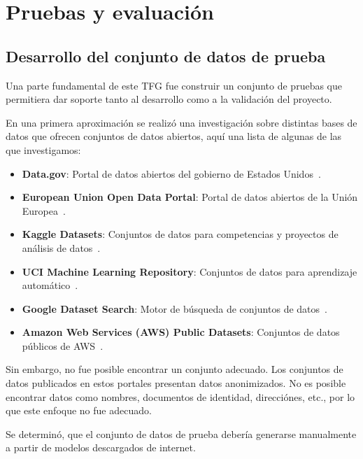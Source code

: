 \section{Pruebas y evaluación}\label{sec:pruebas_y_evaluacion}

\subsection*{Desarrollo del conjunto de datos de prueba}

Una parte fundamental de este TFG fue construir un conjunto de pruebas que permitiera dar soporte tanto al
desarrollo como a la validación del proyecto.

En una primera aproximación se realizó una investigación sobre distintas bases de datos que ofrecen
conjuntos de datos abiertos, aquí una lista de algunas de las que investigamos:

\begin{itemize}
    \item \textbf{Data.gov}: Portal de datos abiertos del gobierno de Estados Unidos~\cite{https://www.data.gov/}.
    \item \textbf{European Union Open Data Portal}: Portal de datos abiertos de la Unión
    Europea~\cite{https://data.europa.eu/euodp/en/home}.
    \item \textbf{Kaggle Datasets}: Conjuntos de datos para competencias y proyectos de análisis de
    datos~\cite{https://www.kaggle.com/datasets}.
    \item \textbf{UCI Machine Learning Repository}: Conjuntos de datos para aprendizaje
    automático~\cite{https://archive.ics.uci.edu/ml/index.php}.
    \item \textbf{Google Dataset Search}: Motor de búsqueda de conjuntos de
    datos~\cite{https://datasetsearch.research.google.com/}.
    \item \textbf{Amazon Web Services (AWS) Public Datasets}: Conjuntos de datos públicos de
    AWS~\cite{https://registry.opendata.aws/}.
\end{itemize}

Sin embargo, no fue posible encontrar un conjunto adecuado.
Los conjuntos de datos publicados en estos portales presentan datos anonimizados.
No es posible encontrar datos como nombres, documentos de identidad, direcciónes, etc., por lo que este enfoque no fue
adecuado.

Se determinó, que el conjunto de datos de prueba debería generarse manualmente a partir de modelos descargados de
internet.

